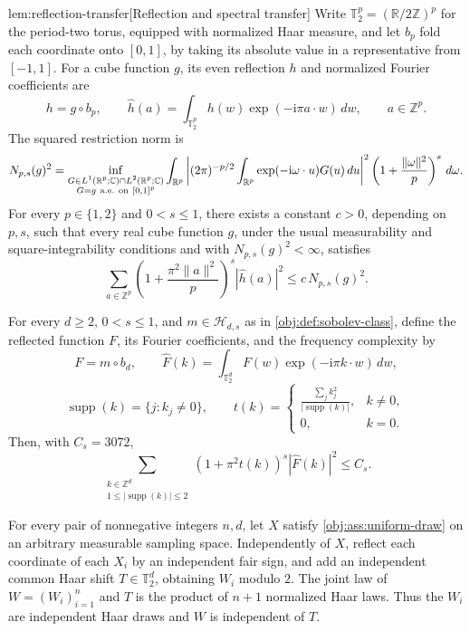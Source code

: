 \documentclass[11pt]{article}
\begin{document}
\begin{lemmav}{lem:reflection-transfer}[Reflection and spectral transfer]
Write \(\mathbb T_2^p=(\mathbb R/2\mathbb Z)^p\) for the period-two torus, equipped with normalized Haar measure, and let \(b_p\) fold each coordinate onto \([0,1]\), by taking its absolute value in a representative from \([-1,1]\). For a cube function \(g\), its even reflection \(h\) and normalized Fourier coefficients are
\[
h=g\circ b_p,\qquad
\widehat h(a)=\int_{\mathbb T_2^p}h(w)
  \exp(-\mathrm i\pi a\cdot w)\,dw,
\qquad a\in\mathbb Z^p.
\]
The squared restriction norm is
\[
N_{p,s}(g)^2
=
\inf_{\substack{G\in L^1(\mathbb R^p;\mathbb C)\cap L^2(\mathbb R^p;\mathbb C)\\
G=g\ {\rm a.e.}\ {\rm on}\ [0,1]^p}}
\int_{\mathbb R^p}
\left|
(2\pi)^{-p/2}
\int_{\mathbb R^p}\exp(-\mathrm i\omega\cdot u)G(u)\,du
\right|^2
\left(1+\frac{\|\omega\|^2}{p}\right)^s\,d\omega.
\]
For every \(p\in\{1,2\}\) and \(0<s\leq1\), there exists a constant \(c>0\), depending on \(p,s\), such that every real cube function \(g\), under the usual measurability and square-integrability conditions and with \(N_{p,s}(g)^2<\infty\), satisfies
\[
\sum_{a\in\mathbb Z^p}
\left(1+\frac{\pi^2\|a\|^2}{p}\right)^s
|\widehat h(a)|^2
\leq c\,N_{p,s}(g)^2.
\]

For every \(d\geq2\), \(0<s\leq1\), and \(m\in\mathcal H_{d,s}\) as in \cref{obj:def:sobolev-class}, define the reflected function \(F\), its Fourier coefficients, and the frequency complexity by
\[
F=m\circ b_d,\qquad
\widehat F(k)=\int_{\mathbb T_2^d}F(w)
  \exp(-\mathrm i\pi k\cdot w)\,dw,
\]
\[
\operatorname{supp}(k)=\{j:k_j\neq0\},\qquad
t(k)=
\begin{cases}
\displaystyle\frac{\sum_j k_j^2}{|\operatorname{supp}(k)|},&k\neq0,\\
0,&k=0.
\end{cases}
\]
Then, with \(C_s=3072\),
\[
\sum_{\substack{k\in\mathbb Z^d\\
1\leq|\operatorname{supp}(k)|\leq2}}
(1+\pi^2t(k))^s|\widehat F(k)|^2
\leq C_s.
\]

For every pair of nonnegative integers \(n,d\), let \(X\) satisfy \cref{obj:ass:uniform-draw} on an arbitrary measurable sampling space. Independently of \(X\), reflect each coordinate of each \(X_i\) by an independent fair sign, and add an independent common Haar shift \(T\in\mathbb T_2^d\), obtaining \(W_i\) modulo \(2\). The joint law of \(W=(W_i)_{i=1}^n\) and \(T\) is the product of \(n+1\) normalized Haar laws. Thus the \(W_i\) are independent Haar draws and \(W\) is independent of \(T\).


\end{lemmav}
\end{document}
